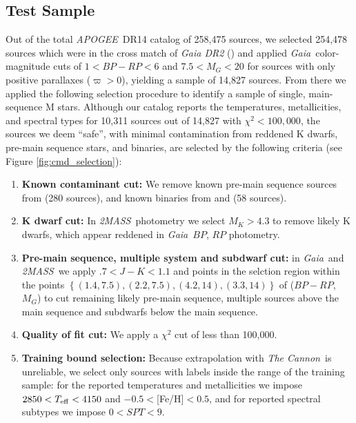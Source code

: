 \documentclass[modern]{aastex62}
\newcommand{\apogee}{\textsl{APOGEE}}
\newcommand{\thecannon}{\textsl{The Cannon}}
\newcommand{\gaia}{\textsl{Gaia}}
\newcommand{\zmass}{\textsl{2MASS}}
\begin{document}
\subsection{Test Sample \label{subsec:test_selection}} 
Out of the total \apogee\ DR14 catalog of 258,475 sources, we selected 254,478 sources which were in the cross match of \textsl{Gaia DR2} (\citealt{Brown:2018}) and applied \gaia\ color-magnitude cuts of $1<BP-RP<6$ and $7.5<M_G<20$ for sources with only positive parallaxes ($\varpi>0$), yielding a sample of 14,827 sources. From there we applied the following selection procedure to identify a sample of single, main-sequence M stars. Although our catalog reports the temperatures, metallicities, and spectral types for 10,311 sources out of 14,827 with $\chi^2<100,000$, the sources we deem ``safe'', with minimal contamination from reddened K dwarfs, pre-main sequence stars, and binaries, are selected by the following criteria (see Figure \ref{fig:cmd_selection}):

\begin{enumerate}
\item \textbf{Known contaminant cut:} We remove known pre-main sequence sources from \citealt{Cottaar:2014} (280 sources), and known binaries from \citealt{ElBadry:2018} and \citealt{Skinner:2018} (58 sources).

\item \textbf{K dwarf cut:} In \zmass\ photometry we select $M_K > 4.3$ to remove likely K dwarfs, which appear reddened in \gaia\ $BP$, $RP$ photometry.

\item \textbf{Pre-main sequence, multiple system and subdwarf cut:} in \gaia\ and \zmass\ we apply $.7<J-K<1.1$ and points in the selction region within the points $\left\{ (1.4, 7.5), (2.2, 7.5), (4.2, 14), (3.3, 14) \right\}$ of ($BP-RP$, $M_G$) to cut remaining likely pre-main sequence, multiple sources above the main sequence and subdwarfs below the main sequence.

\item \textbf{Quality of fit cut:} We apply a $\chi^2$ cut of less than 100,000.

\item \textbf{Training bound selection:} Because extrapolation with \thecannon\ is unreliable, we select only sources with labels inside the range of the training sample: for the reported temperatures and metallicities we impose $2850<T_{\rm eff}<4150$ and $-0.5<$[Fe/H]$<0.5$, and for reported spectral subtypes we impose $0<SPT<9$.
\end{enumerate}
\end{document}
